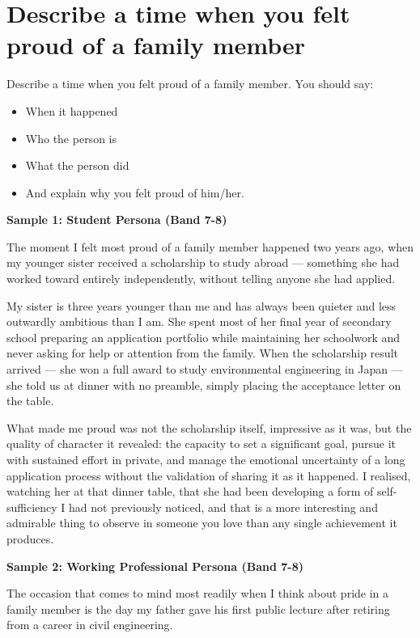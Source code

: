\section{Describe a time when you felt proud of a family member}
\begin{ieltsprompt}
Describe a time when you felt proud of a family member.
You should say:
\begin{itemize}[leftmargin=2em, itemsep=2pt]
\item When it happened
\item Who the person is
\item What the person did
\item And explain why you felt proud of him/her.
\end{itemize}
\end{ieltsprompt}
\begin{ieltsanswer}
\textbf{Sample 1: Student Persona (Band 7-8)}

The moment I felt most proud of a family member happened two years ago, when my younger sister received a scholarship to study abroad — something she had worked toward entirely independently, without telling anyone she had applied.

My sister is three years younger than me and has always been quieter and less outwardly ambitious than I am. She spent most of her final year of secondary school preparing an application portfolio while maintaining her schoolwork and never asking for help or attention from the family. When the scholarship result arrived — she won a full award to study environmental engineering in Japan — she told us at dinner with no preamble, simply placing the acceptance letter on the table.

What made me proud was not the scholarship itself, impressive as it was, but the quality of character it revealed: the capacity to set a significant goal, pursue it with sustained effort in private, and manage the emotional uncertainty of a long application process without the validation of sharing it as it happened. I realised, watching her at that dinner table, that she had been developing a form of self-sufficiency I had not previously noticed, and that is a more interesting and admirable thing to observe in someone you love than any single achievement it produces.

\textbf{Sample 2: Working Professional Persona (Band 7-8)}

The occasion that comes to mind most readily when I think about pride in a family member is the day my father gave his first public lecture after retiring from a career in civil engineering.


\end{ieltsanswer}
